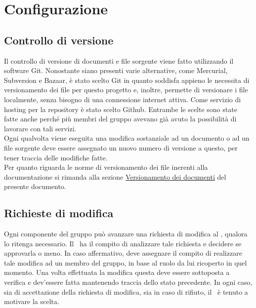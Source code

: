 \documentclass[../NormeProgetto.tex]{subfiles}
\begin{document}
	\section{Configurazione}
	\subsection{Controllo di versione}
	Il controllo di versione di documenti e file sorgente viene fatto utilizzando il software Git. Nonostante siano presenti varie alternative, come Mercurial, Subversion e Bazaar, è stato scelto Git in quanto soddisfa appieno le necessita di versionamento dei file per questo progetto e, inoltre, permette di versionare i file localmente, senza bisogno di una connessione internet attiva. Come servizio di hosting per la repository è stato scelto Github. Entrambe le scelte sono state fatte anche perché più membri del gruppo avevano già avuto la possibilità di lavorare con tali servizi. \\ Ogni qualvolta viene eseguita una modifica sostanziale ad un documento o ad un file sorgente deve essere assegnato un nuovo numero di versione a questo, per tener traccia delle modifiche fatte. \\ Per quanto riguarda le norme di versionamento dei file inerenti alla documentazione si rimanda alla sezione \hyperref[sec:Versionamento dei documenti]{Versionamento dei documenti} del presente documento.
	\subsection{Richieste di modifica}
	Ogni componente del gruppo può avanzare una richiesta di modifica al \responsabilediprogetto, qualora lo ritenga necessario. Il \responsabilediprogetto\ ha il compito di analizzare tale richiesta e decidere se approvarla o meno. In caso affermativo, deve assegnare il compito di realizzare tale modifica ad un membro del gruppo, in base al ruolo da lui ricoperto in quel momento. Una volta effettuata la modifica questa deve essere sottoposta a verifica e dev'essere fatta mantenendo traccia dello stato precedente. In ogni caso, sia di accettazione della richiesta di modifica, sia in caso di rifiuto, il \responsabilediprogetto\ è tenuto a motivare la scelta.
\end{document}
